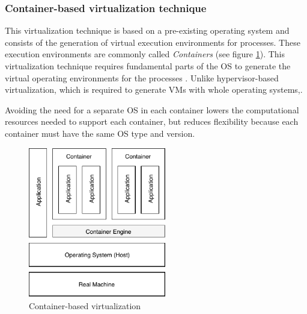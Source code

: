 	\subsubsection {Container-based virtualization technique}
	
	This virtualization technique is based on a pre-existing operating system and consists of the generation of virtual execution environments for processes. 
	These execution environments are commonly called \textit{Containers} (see figure \ref{fig:container-baseVirtualization}). 
	This virtualization technique requires fundamental parts of the OS to generate the virtual operating environments for the processes \cite{Kon2017}.
	Unlike hypervisor-based virtualization, which is required to generate VMs with whole operating systems,\cite{Kon2017}. 
	
	
	Avoiding the need for a separate OS in each container lowers the computational resources needed to support each container, but reduces flexibility because each container must have the same OS type and version. 
	
	\begin{figure}[ht] %
		\centering
		\includegraphics[width=6cm]{images/container-BasedVirtualization.pdf}
		\vspace{-0.2cm}
		\caption{Container-based virtualization}
		\label{fig:container-baseVirtualization}
	\end{figure}
	